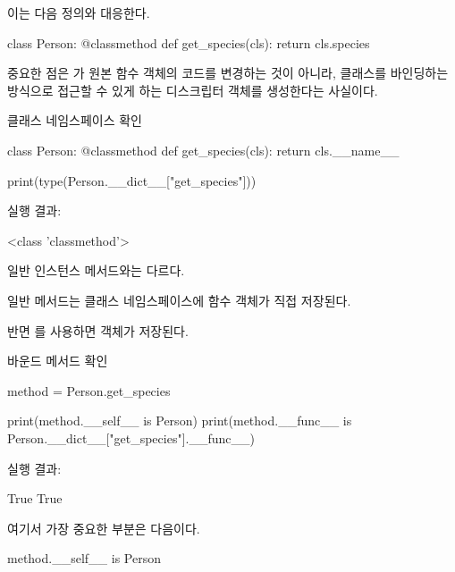 이는 다음 정의와 대응한다.

\begin{dhkcode}
class Person:
    @classmethod
    def get_species(cls):
        return cls.species
\end{dhkcode}

중요한 점은 가 원본 함수 객체의 코드를 변경하는 것이 아니라, 클래스를 바인딩하는 방식으로 접근할 수 있게 하는 디스크립터 객체를 생성한다는 사실이다.

\begin{dhknote}
\begin{dhksmry}[centered]
클래스 네임스페이스 확인
\end{dhksmry}
\end{dhknote}

\begin{dhkcode}
class Person:
    @classmethod
    def get_species(cls):
        return cls.__name__

print(type(Person.__dict__["get_species"]))
\end{dhkcode}

실행 결과:

\begin{dhkzsh}
<class 'classmethod'>
\end{dhkzsh}

일반 인스턴스 메서드와는 다르다.

일반 메서드는 클래스 네임스페이스에 함수 객체가 직접 저장된다.

반면 를 사용하면  객체가 저장된다.

\begin{dhknote}
\begin{dhksmry}[centered]
바운드 메서드 확인
\end{dhksmry}
\end{dhknote}

\begin{dhkcode}
method = Person.get_species

print(method.__self__ is Person)
print(method.__func__ is Person.__dict__["get_species"].__func__)
\end{dhkcode}

실행 결과:

\begin{dhkzsh}
True
True
\end{dhkzsh}

여기서 가장 중요한 부분은 다음이다.

\begin{dhkcode}
method.__self__ is Person
\end{dhkcode}


